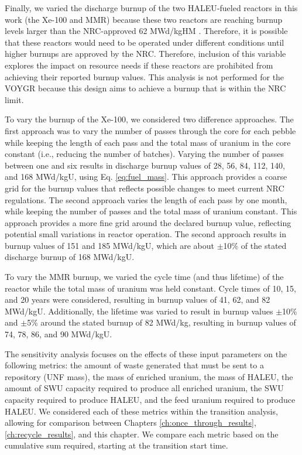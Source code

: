 Finally, we varied the discharge burnup of the two \gls{HALEU}-fueled 
reactors in this work (the Xe-100 and \gls{MMR}) because these two reactors 
are reaching burnup levels larger than the \gls{NRC}-approved 62 MWd/kgHM 
\cite{noauthor_higher_2023}. Therefore, it is possible that these 
reactors would need to be operated under different conditions until
higher burnups are approved by the \gls{NRC}.
Therefore, inclusion of this variable explores the impact 
on resource needs if these reactors are prohibited from achieving 
their 
reported burnup values. This analysis is not performed for the VOYGR because this 
design aims to achieve a burnup that is within the \gls{NRC} limit. 

To vary the burnup of the Xe-100, we considered two difference approaches. The 
first approach was to vary the number of passes through the core for each pebble 
while keeping the length of each pass and the total mass of uranium 
in the core constant (i.e., reducing the number of batches). Varying the 
number of passes between one and six 
results in discharge burnup values of 28, 56, 84, 112, 140, and 168 MWd/kgU, 
using Eq. \ref{eq:fuel_mass}. This approach provides a coarse grid 
for the burnup values that reflects possible changes to meet current 
\gls{NRC} regulations. The second approach varies the length 
of each pass by one month, while keeping the number of passes and the 
total mass of uranium 
constant. This approach provides a more fine grid around the declared 
burnup value, reflecting potential small variations in reactor operation. 
The second approach results in burnup values of 151 and 185 MWd/kgU, 
which are about $\pm$10\% of the stated discharge burnup of 168 MWd/kgU. 

To vary the \gls{MMR} burnup, we varied the cycle time (and thus lifetime) of 
the reactor while the total mass of uranium was held constant. 
Cycle times of 10, 15, and 20 years were considered, resulting in burnup 
values of 41, 62, and 82 MWd/kgU. Additionally, the lifetime was varied to 
result in burnup values $\pm$10\% and $\pm$5\% around the stated burnup of 
82 MWd/kg, resulting in burnup values of 74, 78, 86, and 90 MWd/kgU. 

The sensitivity analysis focuses on the effects of these input parameters 
on the following metrics: the amount of waste generated that 
must be sent to a repository (\gls{UNF} mass), the mass of enriched uranium, 
the mass of \gls{HALEU},
the amount of \gls{SWU} capacity required to produce all enriched uranium, the 
\gls{SWU} capacity required to produce \gls{HALEU}, and the feed uranium 
required to produce \gls{HALEU}. We considered each of these metrics 
within the transition analysis, allowing for comparison between Chapters 
\ref{ch:once_through_results}, \ref{ch:recycle_results}, and this chapter. 
We compare each metric based on the cumulative sum required, starting 
at the transition start time. 






